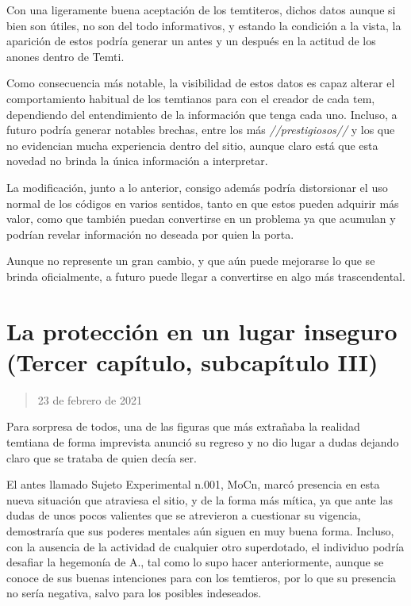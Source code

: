 \documentclass[
  spanish,
]{book}
\begin{document}
Con una ligeramente buena aceptación de los temtiteros, dichos datos aunque si bien son útiles, no son del todo informativos, y estando la condición a la vista, la aparición de estos podría generar un antes y un después en la actitud de los anones dentro de Temti.

Como consecuencia más notable, la visibilidad de estos datos es capaz alterar el comportamiento habitual de los temtianos para con el creador de cada tem, dependiendo del entendimiento de la información que tenga cada uno. Incluso, a futuro podría generar notables brechas, entre los más \emph{//prestigiosos//} y los que no evidencian mucha experiencia dentro del sitio, aunque claro está que esta novedad no brinda la única información a interpretar.

La modificación, junto a lo anterior, consigo además podría distorsionar el uso normal de los códigos en varios sentidos, tanto en que estos pueden adquirir más valor, como que también puedan convertirse en un problema ya que acumulan y podrían revelar información no deseada por quien la porta.

Aunque no represente un gran cambio, y que aún puede mejorarse lo que se brinda oficialmente, a futuro puede llegar a convertirse en algo más trascendental.

\hypertarget{la-protecciuxf3n-en-un-lugar-inseguro-tercer-capuxedtulo-subcapuxedtulo-iii}{%
\section{La protección en un lugar inseguro (Tercer capítulo, subcapítulo III)}\label{la-protecciuxf3n-en-un-lugar-inseguro-tercer-capuxedtulo-subcapuxedtulo-iii}}

\begin{quote}
23 de febrero de 2021
\end{quote}

Para sorpresa de todos, una de las figuras que más extrañaba la realidad temtiana de forma imprevista anunció su regreso y no dio lugar a dudas dejando claro que se trataba de quien decía ser.

El antes llamado Sujeto Experimental n.001, MoCn, marcó presencia en esta nueva situación que atraviesa el sitio, y de la forma más mítica, ya que ante las dudas de unos pocos valientes que se atrevieron a cuestionar su vigencia, demostraría que sus poderes mentales aún siguen en muy buena forma. Incluso, con la ausencia de la actividad de cualquier otro superdotado, el individuo podría desafiar la hegemonía de A., tal como lo supo hacer anteriormente, aunque se conoce de sus buenas intenciones para con los temtieros, por lo que su presencia no sería negativa, salvo para los posibles indeseados.
\end{document}
